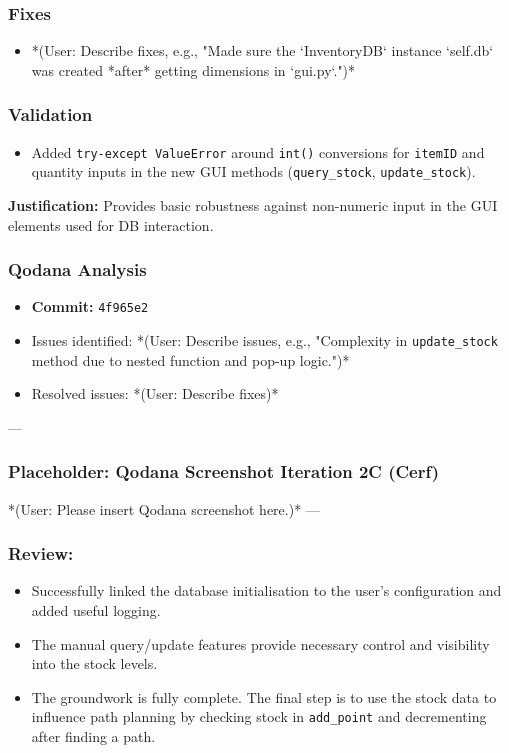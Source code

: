 \subsubsection{Fixes}
\begin{itemize}
	\item *(User: Describe fixes, e.g., "Made sure the `InventoryDB` instance `self.db` was created *after* getting dimensions in `gui.py`.")*
\end{itemize}

\subsubsection{Validation}
\begin{itemize}
	\item Added \verb|try-except ValueError| around \verb|int()| conversions for \verb|itemID| and quantity inputs in the new GUI methods (\verb|query_stock|, \verb|update_stock|).
\end{itemize}
\textbf{Justification:} Provides basic robustness against non-numeric input in the GUI elements used for DB interaction.

\subsubsection{Qodana Analysis}
\begin{itemize}
	\item \textbf{Commit:} \verb|4f965e2|
	\item Issues identified: *(User: Describe issues, e.g., "Complexity in \verb|update_stock| method due to nested function and pop-up logic.")*
	\item Resolved issues: *(User: Describe fixes)*
\end{itemize}

--- %
\subsubsection*{Placeholder: Qodana Screenshot Iteration 2C (Cerf)}
*(User: Please insert Qodana screenshot here.)*
---

\subsubsection{Review:}
\begin{itemize}
	\item Successfully linked the database initialisation to the user's configuration and added useful logging.
	\item The manual query/update features provide necessary control and visibility into the stock levels.
	\item The groundwork is fully complete. The final step is to use the stock data to influence path planning by checking stock in \verb|add_point| and decrementing after finding a path.
\end{itemize}

